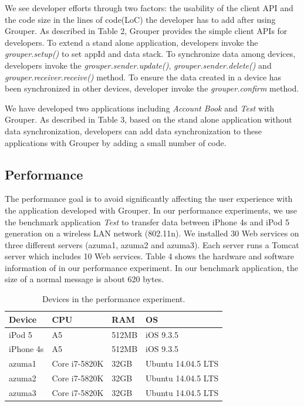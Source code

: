 \documentclass[twocolumn,10pt]{article}
\begin{document}
We see developer efforts through two factors: the usability of the client API and the code size in the lines of code(LoC) the developer has to add after using Grouper. 
As described in Table 2, Grouper provides the simple client APIs for developers.
To extend a stand alone application, developers invoke the \emph{grouper.setup()} to set appId and data stack.
To synchronize data among devices, developers invoke the \emph{grouper.sender.update()}, \emph{grouper.sender.delete()} and \emph{grouper.receiver.receive()} method.
To ensure the data created in a device has been synchronized in other devices, developer invoke the \emph{grouper.confirm} method.

We have developed two applications including \emph{Account Book} and \emph{Test} with Grouper. 
As described in Table 3, based on the stand alone application without data synchronization, developers can add data synchronization to these applications with Grouper by adding a small number of code. 

\subsection{Performance}

The performance goal is to avoid significantly affecting the user experience with the application developed with Grouper. 
In our performance experiments, we use the benchmark application \emph{Test} to transfer data between iPhone 4s and iPod 5 generation on a wireless LAN network (802.11n).
We installed 30 Web services on three different servers (azuma1, azuma2 and azuma3).
Each server runs a Tomcat server which includes 10 Web services.
Table 4 shows the hardware and software information of in our performance experiment.
In our benchmark application, the size of a normal message is about 620 bytes.

\begin{table}[t]
	\footnotesize
	\centering  
	\caption{Devices in the performance experiment.}
	\label{my-label}
	\begin{tabular}{llll}
		\hline
		\textbf{Device} & \textbf{CPU} & \textbf{RAM} & \textbf{OS} \\ \hline
		iPod 5 & A5 & 512MB & iOS 9.3.5 \\
		iPhone 4s & A5 & 512MB & iOS 9.3.5 \\
		azuma1 & Core i7-5820K & 32GB & Ubuntu 14.04.5 LTS \\
		azuma2 & Core i7-5820K & 32GB & Ubuntu 14.04.5 LTS \\
		azuma3 & Core i7-5820K & 32GB & Ubuntu 14.04.5 LTS \\ \hline
	\end{tabular}
\end{table}
\end{document}
